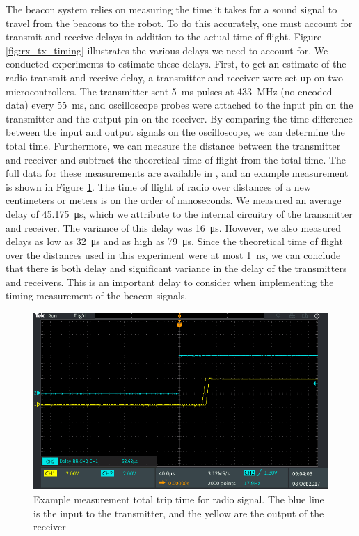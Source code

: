 \documentclass{article}
\begin{document}
    The beacon system relies on measuring the time it takes for a sound signal to travel from the beacons to the robot. To do this accurately, one must account for transmit and receive delays in addition to the actual time of flight. Figure \ref{fig:rx_tx_timing} illustrates the various delays we need to account for. We conducted experiments to estimate these delays. First, to get an estimate of the radio transmit and receive delay, a transmitter and receiver were set up on two microcontrollers. The transmitter sent \SI{5}{\milli\second} pulses at \SI{433}{\mega\hertz} (no encoded data) every \SI{55}{\milli\second}, and oscilloscope probes were attached to the input pin on the transmitter and the output pin on the receiver. By comparing the time difference between the input and output signals on the oscilloscope, we can determine the total time. Furthermore, we can measure the distance between the transmitter and receiver and subtract the theoretical time of flight from the total time. The full data for these measurements are available in , and an example measurement is shown in Figure \ref{fig:rf_delay_ex}. The time of flight of radio over distances of a new centimeters or meters is on the order of nanoseconds. We measured an average delay of \SI{45.175}{\micro\second}, which we attribute to the internal circuitry of the transmitter and receiver. The variance of this delay was \SI{16}{\micro\second}. However, we also measured delays as low as \SI{32}{\micro\second} and as high as \SI{79}{\micro\second}. Since the theoretical time of flight over the distances used in this experiment were at most \SI{1}{\nano\second}, we can conclude that there is both delay and significant variance in the delay of the transmitters and receivers. This is an important delay to consider when implementing the timing measurement of the beacon signals.

    \begin{figure}[H]
      \centering
      \includegraphics[scale=0.2]{./images/rf_delay_ex.PNG}
      \caption{Example measurement total trip time for radio signal. The blue line is the input to the transmitter, and the yellow are the output of the receiver}
      \label{fig:rf_delay_ex}
    \end{figure}
\end{document}
